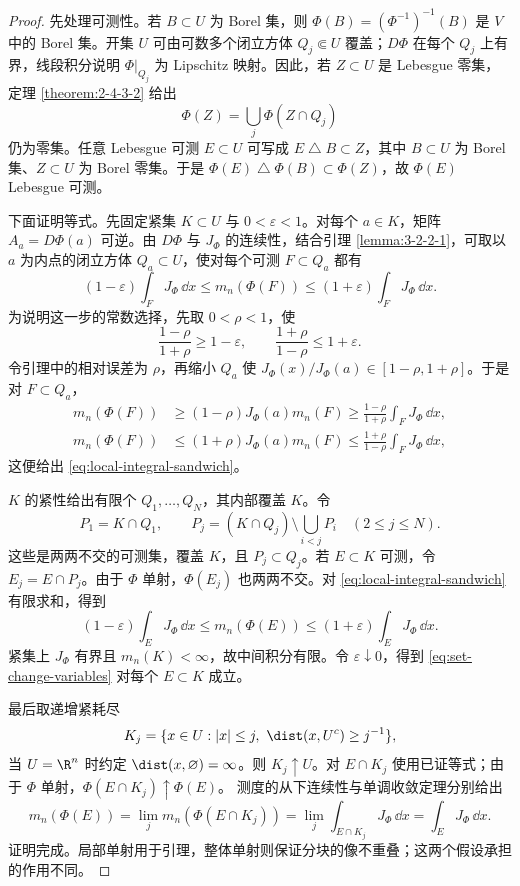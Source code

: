 \begin{proof}
先处理可测性。若 $B\subset U$ 为 Borel 集，则
$\Phi(B)=(\Phi^{-1})^{-1}(B)$ 是 $V$ 中的 Borel 集。开集 $U$ 可由可数多个闭立方体
$Q_j\Subset U$ 覆盖；$D\Phi$ 在每个 $Q_j$ 上有界，线段积分说明
$\Phi|_{Q_j}$ 为 Lipschitz 映射。因此，若 $Z\subset U$ 是 Lebesgue 零集，定理
\ref{theorem:2-4-3-2} 给出
\[
 \Phi(Z)=\bigcup_j\Phi(Z\cap Q_j)
\]
仍为零集。任意 Lebesgue 可测 $E\subset U$ 可写成
$E\mathbin\triangle B\subset Z$，其中 $B\subset U$ 为 Borel 集、$Z\subset U$ 为 Borel 零集。于是
$\Phi(E)\mathbin\triangle\Phi(B)\subset\Phi(Z)$，故 $\Phi(E)$ Lebesgue 可测。

下面证明等式。先固定紧集 $K\subset U$ 与 $0<\varepsilon<1$。对每个 $a\in K$，矩阵
$A_a=D\Phi(a)$ 可逆。由 $D\Phi$ 与 $J_\Phi$ 的连续性，结合引理
\ref{lemma:3-2-2-1}，可取以 $a$ 为内点的闭立方体 $Q_a\subset U$，使对每个可测
$F\subset Q_a$ 都有
\[
 (1-\varepsilon)\int_FJ_\Phi\,\dd x
 \le m_n(\Phi(F))
 \le(1+\varepsilon)\int_FJ_\Phi\,\dd x.
 \tag{3.2.13}\label{eq:local-integral-sandwich}
\]
为说明这一步的常数选择，先取 $0<\rho<1$，使
\[
 \frac{1-\rho}{1+\rho}\ge1-\varepsilon,
 \qquad
 \frac{1+\rho}{1-\rho}\le1+\varepsilon.
\]
令引理中的相对误差为 $\rho$，再缩小 $Q_a$ 使
$J_\Phi(x)/J_\Phi(a)\in[1-\rho,1+\rho]$。于是对 $F\subset Q_a$，
\[
 \begin{aligned}
 m_n(\Phi(F))
 &\ge(1-\rho)J_\Phi(a)m_n(F)
 \ge\frac{1-\rho}{1+\rho}\int_FJ_\Phi\,\dd x,\\
 m_n(\Phi(F))
 &\le(1+\rho)J_\Phi(a)m_n(F)
 \le\frac{1+\rho}{1-\rho}\int_FJ_\Phi\,\dd x,
 \end{aligned}
\]
这便给出 \eqref{eq:local-integral-sandwich}。

$K$ 的紧性给出有限个 $Q_1,\dots,Q_N$，其内部覆盖 $K$。令
\[
 P_1=K\cap Q_1,
 \qquad
 P_j=(K\cap Q_j)\setminus\bigcup_{i<j}P_i\quad(2\le j\le N).
\]
这些是两两不交的可测集，覆盖 $K$，且 $P_j\subset Q_j$。若 $E\subset K$ 可测，令
$E_j=E\cap P_j$。由于 $\Phi$ 单射，$\Phi(E_j)$ 也两两不交。对
\eqref{eq:local-integral-sandwich} 有限求和，得到
\[
 (1-\varepsilon)\int_EJ_\Phi\,\dd x
 \le m_n(\Phi(E))
 \le(1+\varepsilon)\int_EJ_\Phi\,\dd x.
\]
紧集上 $J_\Phi$ 有界且 $m_n(K)<\infty$，故中间积分有限。令
$\varepsilon\downarrow0$，得到 \eqref{eq:set-change-variables} 对每个 $E\subset K$ 成立。

最后取递增紧耗尽
\[
 K_j=\{x\in U:|x|\le j,\ \dist(x,U^c)\ge j^{-1}\},
\]
当 $U=\R^n$ 时约定 $\dist(x,\varnothing)=\infty$。则 $K_j\uparrow U$。对
$E\cap K_j$ 使用已证等式；由于 $\Phi$ 单射，$\Phi(E\cap K_j)\uparrow\Phi(E)$。
测度的从下连续性与单调收敛定理分别给出
\[
 m_n(\Phi(E))
 =\lim_jm_n(\Phi(E\cap K_j))
 =\lim_j\int_{E\cap K_j}J_\Phi\,\dd x
 =\int_EJ_\Phi\,\dd x.
\]
证明完成。局部单射用于引理，整体单射则保证分块的像不重叠；这两个假设承担的作用不同。
\end{proof}


